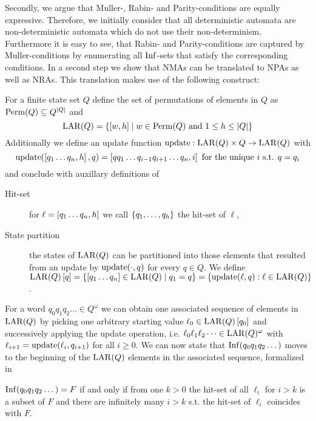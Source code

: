 Secondly, we argue that Muller-, Rabin- and Parity-conditions are
equally expressive. Therefore, we initially consider that all deterministic
automata are non-deterministic automata which do not use their
non-determinism. Furthermore it is easy to see, that Rabin- and
Parity-conditions are captured by Muller-conditions by enumerating all
$\operatorname{Inf}$-sets that satisfy the corresponding conditions. In a second step we
show that \acp{NMA} can be translated to \acp{NPA} as well as \acp{NRA}. This
translation makes use of the following construct:
\begin{definition}
  For a finite state set $Q$ define the set of permutations of elements in
  $Q$ as $\operatorname{Perm}(Q)\subseteq Q^{\left\vert{Q}\right\vert}$ and
  \begin{equation*}
    \operatorname{LAR}(Q) = \left\{\left[w,h\right]\mid w\in\operatorname{Perm}(Q)\text{ and }1\leq
    h\leq\left\vert{Q}\right\vert\right\}
  \end{equation*}
  Additionally we define an update function
  $\operatorname{update}:\operatorname{LAR}(Q)\times Q\rightarrow\operatorname{LAR}(Q)$ with
  \begin{equation*}
    \operatorname{update}(\left[q_{1}\dots q_{n},h\right], q)
    = \left[qq_{1}\dots q_{i-1}q_{i+1}\dots q_{n},i\right]
    \text{ for the unique }i\text{ s.t. }q=q_{i}
  \end{equation*}
  and conclude with auxillary definitions of
  \begin{description}
    \item [Hit-set] for $\ell = \left[q_{1}\dots q_{n},h\right]$ we call
      $\left\{q_{1},\dots,q_{h}\right\}$ the hit-set of $\ell$,
    \item [State partition] the states of $\operatorname{LAR}(Q)$ can be partitioned into
      those elements that resulted from an update by $\operatorname{update}(\cdot, q)$ for
      every $q\in Q$. We define
      $\operatorname{LAR}(Q)\left[q\right] = \left\{\left[q_{1}\dots q_{n}\right]\in\operatorname{LAR}(Q)\mid
        q_{1} = q\right\} = \left\{\operatorname{update}(\ell, q):\ell\in\operatorname{LAR}(Q)\right\}$.
  \end{description}
\end{definition}
For a word $q_{0}q_{1}q_{2}\dots\in Q^{\omega}$ we can obtain one associated
sequence of elements in $\operatorname{LAR}(Q)$ by picking one arbitrary starting value
$\ell_{0}\in\operatorname{LAR}(Q)\left[q_{0}\right]$ and successively applying the update
operation, i.e. $\ell_{0}\ell_{1}\ell_{2}\dots\in\operatorname{LAR}(Q)^{\omega}$ with
$\ell_{i+1} = \operatorname{update}(\ell_{i},q_{i+1})$ for all $i\geq 0$. We can now state that
$\operatorname{Inf}(q_{0}q_{1}q_{2}\dots)$ moves to the beginning of the $\operatorname{LAR}(Q)$ elements 
in the associated sequence, formalized in
\begin{lemma}
  \cite[Lemma 1.21]{AutoLogInfGames}
  $\operatorname{Inf}(q_{0}q_{1}q_{2}\dots) = F$ if and only if from one $k>0$ the hit-set 
  of all $\ell_{i}$ for $i>k$ is a subset of $F$ and there are infinitely 
  many $i>k$ s.t. the hit-set of $\ell_{i}$ coincides with $F$.
  \label{lem:larhitset}
\end{lemma}
